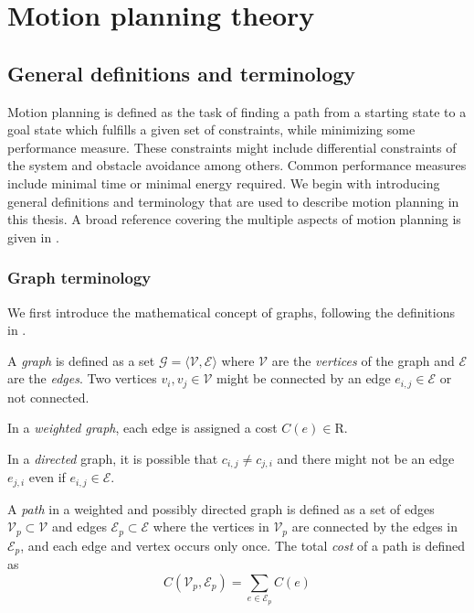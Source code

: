 \chapter{Motion planning theory}\label{cha:motion_planning}
\section{General definitions and terminology}
Motion planning is defined as the task of finding a
path from a starting state to a goal state which fulfills a given set of constraints, while minimizing some 
performance measure.
These constraints might include differential constraints of the system and obstacle avoidance among others.
Common performance measures include minimal time or minimal energy required.
We begin with introducing general definitions and terminology that are used to
describe motion planning in this thesis. A broad reference covering the multiple aspects of motion planning is given in 
\cite{planning_algorithms}.
\subsection{Graph terminology}
We first introduce the mathematical concept of graphs, following the definitions in \cite{graph_theory}.

\begin{definition}[Graph]
    A \textit{graph} is defined as a set $\mathcal{G}=\langle\mathcal{V},\mathcal{E}\rangle$ 
    where $\mathcal{V}$ are the \textit{vertices} of the graph and $\mathcal{E}$ are the \textit{edges}.
    Two vertices $v_i,v_j\in\mathcal{V}$ might be connected by an edge $e_{i,j}\in\mathcal{E}$ or not connected.
\end{definition}
    
\begin{definition}
    In a \textit{weighted graph}, each edge is assigned a cost $C(e)\in\mathrm{R}$. 
\end{definition}


\begin{definition}
    In a \textit{directed} graph, it is possible that $c_{i,j}\neq c_{j,i}$ and
    there might not be an edge $e_{j,i}$ even if $e_{i,j}\in\mathcal{E}$.
\end{definition}

\begin{definition}[Path]
    A \textit{path} in a weighted and possibly directed graph is defined as a set of edges
    $\mathcal{V}_p\subset\mathcal{V}$ and edges $\mathcal{E}_p\subset\mathcal{E}$ where the vertices in 
    $\mathcal{V}_p$ are connected by the edges in $\mathcal{E}_p$, and each edge and vertex occurs only once.
    The total \textit{cost} of a path is defined as
    \begin{equation}
        C(\mathcal{V}_p, \mathcal{E}_p)=\sum_{e\in\mathcal{E}_p}C(e)
    \end{equation}
\end{definition}

